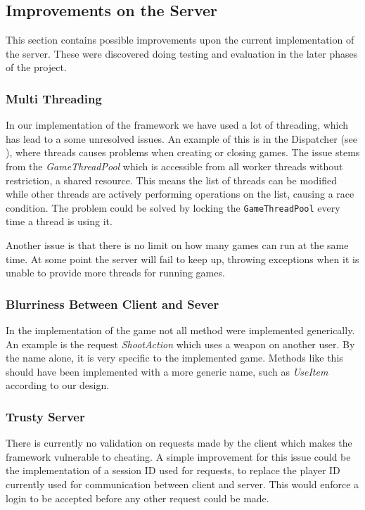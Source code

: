 \subsection{Improvements on the Server}
This section contains possible improvements upon the current implementation of the server. These were discovered doing testing and evaluation in the later phases of the project.  

\subsubsection{Multi Threading}
In our implementation of the framework we have used a lot of threading, which has lead to a some unresolved issues. An example of this is in the Dispatcher (see ), where threads causes problems when creating or closing games. The issue stems from the \textit{GameThreadPool} which is accessible from all worker threads without restriction, a shared resource. This means the list of threads can be modified while other threads are actively performing operations on the list, causing a race condition. The problem could be solved by locking the \texttt{GameThreadPool} every time a thread is using it.

Another issue is that there is no limit on how many games can run at the same time. At some point the server will fail to keep up, throwing exceptions when it is unable to provide more threads for running games.

\subsubsection{Blurriness Between Client and Sever}
In the implementation of the game not all method were implemented generically. An example is the request \textit{ShootAction} which uses a weapon on another user. By the name alone, it is very specific to the implemented game. Methods like this should have been implemented with a more generic name, such as \textit{UseItem} according to our design.

\subsubsection{Trusty Server}
There is currently no validation on requests made by the client which makes the framework vulnerable to cheating. A simple improvement for this issue could be the implementation of a session ID used for requests, to replace the player ID currently used for communication between client and server. This would enforce a login to be accepted before any other request could be made.